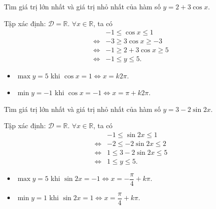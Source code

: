 \begin{bt}%
	Tìm giá trị lớn nhất và giá trị nhỏ nhất của hàm số $ y=2+3 \cos x $.
	\loigiai
	{
		Tập xác định: $ \mathscr{D}=\mathbb{R}$. $ \forall x \in \mathbb{R} $, ta có 
		\begin{eqnarray*}
			&&-1 \leq \cos x \leq 1\\
			&\Leftrightarrow& -3 \geq3 \cos x \geq-3\\
			&\Leftrightarrow&-1 \geq 2+3 \cos  x \geq 5\\
			&\Leftrightarrow& -1 \leq y \leq 5. 
		\end{eqnarray*}
		\begin{itemize}
			\item $ \max y=5 $ khi $ \cos  x=1 \Leftrightarrow x=k2\pi$.
			\item $ \min y=-1 $ khi $ \cos x=-1 \Leftrightarrow x=\pi +k2\pi$.
		\end{itemize}
		
	}
\end{bt}
\begin{bt}%
	Tìm giá trị lớn nhất và giá trị nhỏ nhất của hàm số $y=3-2 \sin 2 x $.
	\loigiai
	{
		Tập xác định: $ \mathscr{D}=\mathbb{R}$. $ \forall x \in \mathbb{R} $, ta có 
		\begin{eqnarray*}
			&&-1 \leq \sin 2x \leq 1\\
			&\Leftrightarrow& -2 \leq -2\sin 2x \leq 2\\
			&\Leftrightarrow& 1 \leq 3-2\sin 2x \leq 5\\
			&\Leftrightarrow& 1 \leq y \leq 5.
		\end{eqnarray*}
		\begin{itemize}
			\item $ \max y=5 $ khi $ \sin 2x=-1 \Leftrightarrow x=-\dfrac{\pi}{4}+k\pi$.
			\item $ \min y=1 $ khi $ \sin 2x=1 \Leftrightarrow x=\dfrac{\pi}{4}+k\pi$.
		\end{itemize}
		
	}
\end{bt}
